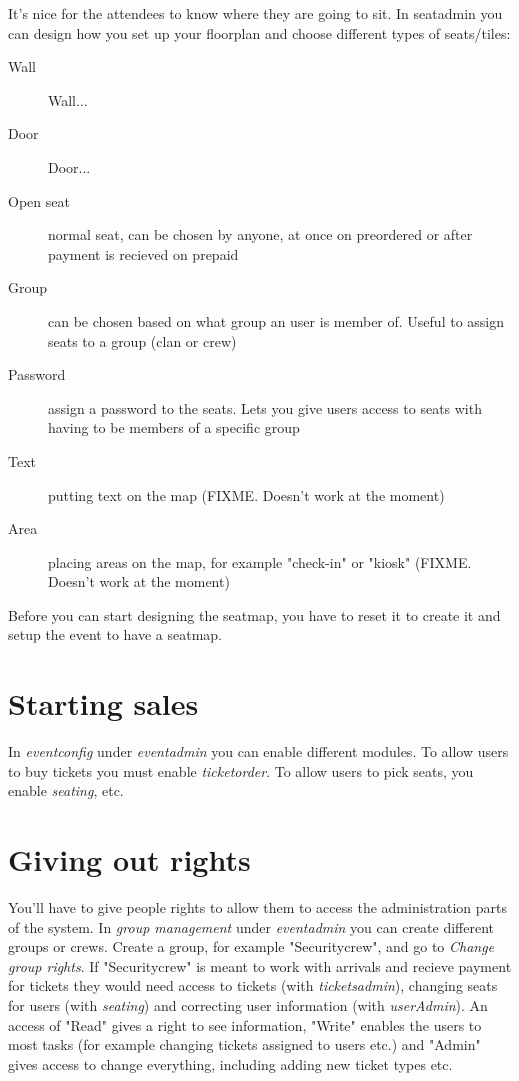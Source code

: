 It's nice for the attendees to know where they are going to sit.
In seatadmin you can design how you set up your floorplan and choose
different types of seats/tiles:
\begin{description}
\item[Wall] Wall...
\item[Door] Door...
\item[Open seat] normal seat, can be chosen by anyone, at once on preordered
or after payment is recieved on prepaid
\item[Group] can be chosen based on what group an user is member of. Useful
to assign seats to a group (clan or crew)
\item[Password] assign a password to the seats. Lets you give users access to
seats with having to be members of a specific group
\item[Text] putting text on the map (FIXME. Doesn't work at the moment)
\item[Area] placing areas on the map, for example "check-in" or "kiosk" (FIXME. Doesn't work at the moment)
\end{description}

Before you can start designing the seatmap, you have to reset it to create it
and setup the event to have a seatmap.

\section{Starting sales}

In \textit{eventconfig} under \textit{eventadmin} you can enable
different modules. To allow users to buy tickets you must enable
\textit{ticketorder}. To allow users to pick seats, you enable
\textit{seating}, etc.

\section{Giving out rights}

You'll have to give people rights to allow them to access the
administration parts of the system.
In \textit{group management} under \textit{eventadmin} you can create
different groups or crews. Create a group, for example "Securitycrew", and go
to \textit{Change group rights}. If "Securitycrew" is meant to work with
arrivals and recieve payment for tickets they would need access to
tickets (with \textit{ticketsadmin}), changing seats for users (with
\textit{seating}) and correcting user information (with
\textit{userAdmin}). An access of "Read" gives a right to see information,
"Write" enables the users to most tasks (for example changing tickets assigned
to users etc.) and "Admin" gives access to change everything, including adding
new ticket types etc.
